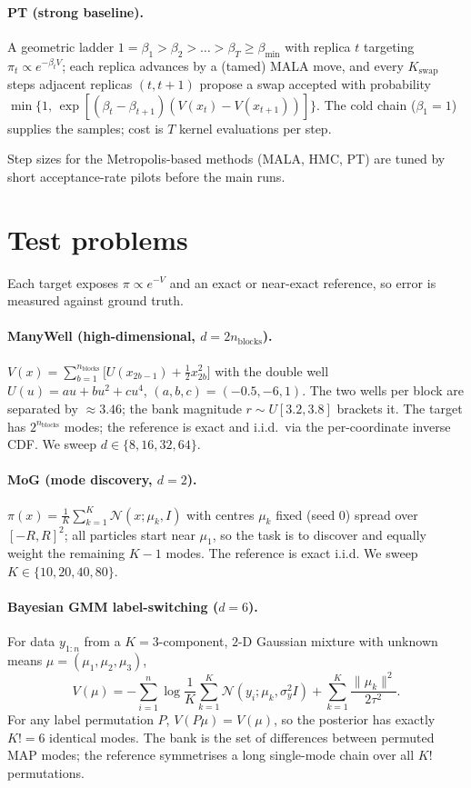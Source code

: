 \documentclass[11pt]{article}
\theoremstyle{plain}
\theoremstyle{remark}
\begin{document}
\paragraph{PT (strong baseline).}
A geometric ladder $1=\beta_1>\beta_2>\dots>\beta_T\ge\beta_{\min}$ with replica $t$
targeting $\pi_t\propto e^{-\beta_t V}$; each replica advances by a (tamed) MALA
move, and every $K_{\mathrm{swap}}$ steps adjacent replicas $(t,t{+}1)$ propose a
swap accepted with probability
$\min\{1,\,\exp[(\beta_t-\beta_{t+1})(V(x_t)-V(x_{t+1}))]\}$. The cold chain
($\beta_1{=}1$) supplies the samples; cost is $T$ kernel evaluations per step.

Step sizes for the Metropolis-based methods (MALA, HMC, PT) are tuned by short
acceptance-rate pilots before the main runs.

\section{Test problems}\label{sec:targets}
Each target exposes $\pi\propto e^{-V}$ and an exact or near-exact reference, so
error is measured against ground truth.

\paragraph{ManyWell (high-dimensional, $d=2n_{\text{blocks}}$).}
$V(x)=\sum_{b=1}^{n_{\text{blocks}}}\big[U(x_{2b-1})+\tfrac12 x_{2b}^2\big]$ with
the double well $U(u)=a u+b u^2+c u^4$, $(a,b,c)=(-0.5,-6,1)$. The two wells per
block are separated by $\approx 3.46$; the bank magnitude $r\sim U[3.2,3.8]$
brackets it. The target has $2^{n_{\text{blocks}}}$ modes; the reference is exact
and i.i.d.\ via the per-coordinate inverse CDF. We sweep
$d\in\{8,16,32,64\}$.

\paragraph{MoG (mode discovery, $d=2$).}
$\pi(x)=\frac1K\sum_{k=1}^{K}\mathcal N(x;\mu_k,I)$ with centres $\mu_k$ fixed
(seed 0) spread over $[-R,R]^2$; all particles start near $\mu_1$, so the task is
to discover and equally weight the remaining $K-1$ modes. The reference is exact
i.i.d. We sweep $K\in\{10,20,40,80\}$.

\paragraph{Bayesian GMM label-switching ($d=6$).}
For data $y_{1:n}$ from a $K{=}3$-component, $2$-D Gaussian mixture with unknown
means $\mu=(\mu_1,\mu_2,\mu_3)$,
\[
V(\mu)=-\sum_{i=1}^{n}\log\frac1K\sum_{k=1}^{K}\mathcal N(y_i;\mu_k,\sigma_y^2 I)
+\sum_{k=1}^{K}\frac{\|\mu_k\|^2}{2\tau^2}.
\]
For any label permutation $P$, $V(P\mu)=V(\mu)$, so the posterior has exactly
$K!{=}6$ identical modes. The bank is the set of differences between permuted MAP
modes; the reference symmetrises a long single-mode chain over all $K!$
permutations.
\end{document}

